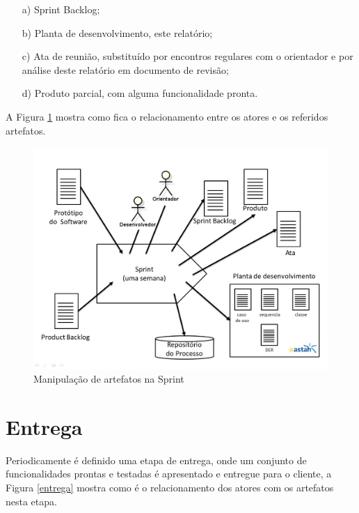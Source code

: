 \begin{itemize}
    \item[a)] Sprint Backlog;
    \item[b)] Planta de desenvolvimento, este relatório;
    \item[c)] Ata de reunião, substituído por encontros regulares com o orientador e por análise deste relatório em documento de revisão;
    \item[d)] Produto parcial, com alguma funcionalidade pronta.
\end{itemize}

A Figura \ref{requisitos} mostra como fica o relacionamento entre os atores e os referidos artefatos.

\begin{figure}[H]
\caption{\label{requisitos} Manipulação de artefatos na Sprint}
\includegraphics[scale=0.33]{img/sprints.jpg}
\end{figure}

\section{Entrega}
Periodicamente é definido uma etapa de entrega, onde um conjunto de funcionalidades prontas e testadas é apresentado e entregue para o cliente, a Figura \ref{entrega} mostra como é o relacionamento dos atores com os artefatos nesta etapa.

